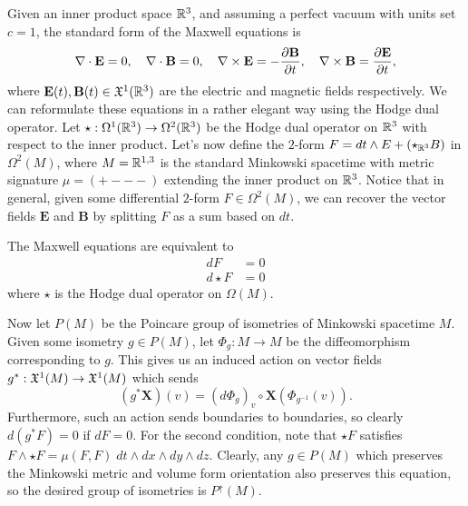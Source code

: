 \documentclass{pset}
\begin{document}
\begin{solution}
  Given an inner product space $\mathbb{R}^3$, and assuming a perfect vacuum with units set $c=1$, the standard form of the Maxwell equations is
  \[
    \nabla\cdot \textbf{E} = 0, \quad \nabla\cdot \textbf{B} = 0, \quad\nabla\times\textbf{E} = -\frac{\partial \textbf{B}}{\partial t}, \quad \nabla\times \textbf{B} = \frac{\partial \textbf{E}}{\partial t},
  \]
  where $\textbf{E}(t), \textbf{B}(t)\in \mathfrak{X}^1(\mathbb{R}^3)$ are the electric and magnetic fields respectively. We can reformulate these equations in a rather elegant way using the Hodge dual operator. Let $\star : \Omega^1(\mathbb{R}^3) \to \Omega^2(\mathbb{R}^3)$ be the Hodge dual operator on $\mathbb{R}^3$ with respect to the inner product. Let's now define the $2$-form $F = dt\wedge E + (\star_{\mathbb{R}^3} B)$ in $\Omega^2(M)$, where $M=\mathbb{R}^{1,3}$ is the standard Minkowski spacetime with metric signature $\mu = (+---)$ extending the inner product on $\mathbb{R}^3$. Notice that in general, given some differential $2$-form $F\in \Omega^2(M)$, we can recover the vector fields $\textbf{E}$ and $\textbf{B}$ by splitting $F$ as a sum based on $dt$. 

  \begin{claim}
    The Maxwell equations are equivalent to \[\begin{aligned}dF &= 0\\d\!\star\! F &= 0\end{aligned}\]
    where $\star$ is the Hodge dual operator on $\Omega(M)$.
  \end{claim}

  Now let $P(M)$ be the Poincare group of isometries of Minkowski spacetime $M$. Given some isometry $g\in P(M)$, let $\Phi_g : M \to M$ be the diffeomorphism corresponding to $g$. This gives us an induced action on vector fields $g^* : \mathfrak{X}^1(M) \to \mathfrak{X}^1(M)$ which sends 
  \[
    \left(g^* \textbf{X}\right)(v) = \left(d\Phi_g\right)_v\circ \textbf{X}(\Phi_{g^{-1}}(v)).
  \]
  Furthermore, such an action sends boundaries to boundaries, so clearly $d(g^*F)=0$ if $dF=0$. For the second condition, note that $\star F$ satisfies $F\wedge \star F = \mu(F, F)\; dt\wedge dx\wedge dy\wedge dz$. Clearly, any $g\in P(M)$ which preserves the Minkowski metric and volume form orientation also preserves this equation, so the desired group of isometries is $P^{\uparrow}(M)$.
\end{solution}
\end{document}
